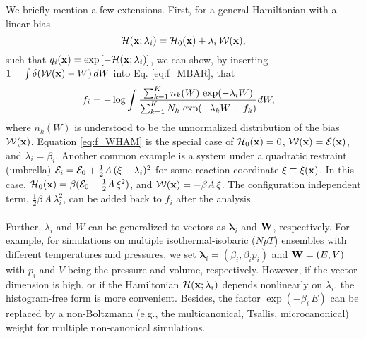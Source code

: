 \documentclass[aip,jcp,preprint,superscriptaddress]{revtex4-1}
\begin{document}
We briefly mention a few extensions.
%
First,
for a general Hamiltonian
with a linear bias
\[
\mathcal{H}(\mathbf{x}; \lambda_i) = \mathcal{H}_0(\mathbf{x}) + \lambda_i \, \mathcal{W}(\mathbf{x}),
\]
such that $q_i(\mathbf{x}) = \exp\left[ -\mathcal{H}(\mathbf{x}; \lambda_i) \right]$,
%
we can show,
by inserting
$1 = \int \delta(\mathcal{W}(\mathbf{x}) - W) \, dW$
into Eq. \eqref{eq:f_MBAR},
that
%
\begin{align}
f_i
&=
-\log
  \int
    \frac{
      \sum_{k = 1}^K n_k(W) \, \exp(-\lambda_i W)
    }
    {
      \sum_{k = 1}^K N_k \, \exp(-\lambda_k W + f_k)
    }
    d W,
\notag
\end{align}
%
where
$n_k(W)$
is understood to be
the unnormalized distribution of
the bias $\mathcal{W}(\mathbf{x})$.
%
Equation \eqref{eq:f_WHAM}
is the special case of
$\mathcal{H}_0(\mathbf{x}) = 0$,
$\mathcal{W}(\mathbf{x}) = \mathcal{E}(\mathbf{x})$,
and $\lambda_i = \beta_i$.
%
Another common example
is a system under a quadratic restraint (umbrella)
$\mathcal{E}_i = \mathcal{E}_0 + \frac 1 2 A \, (\xi - \lambda_i)^2$
for some reaction coordinate $\xi \equiv \xi(\mathbf{x})$.
%
In this case,
$\mathcal{H}_0(\mathbf{x}) = \beta (\mathcal{E}_0 + \frac 1 2 A \, \xi^2)$,
and
$\mathcal{W}(\mathbf{x}) = -\beta A \, \xi$.
%
The configuration independent term,
$\frac 1 2 \beta \, A \, \lambda_i^2$,
can be added back to $f_i$ after the analysis.



\paragraph*{}



Further,
$\lambda_i$ and $W$
can be generalized
to vectors as
$\bm{\lambda}_i$
and
$\mathbf{W}$, respectively.
%
For example,
for simulations
on multiple isothermal-isobaric ($NpT$) ensembles
with different temperatures and pressures,
%
we set
$\bm{\lambda}_i = (\beta_i, \beta_i p_i)$
and
$\mathbf{W} = (E, V)$
with
$p_i$ and $V$
being the pressure and volume,
respectively.
%
However, if the vector dimension is high,
or if the Hamiltonian $\mathcal{H}(\mathbf{x}; \lambda_i)$
depends nonlinearly on $\lambda_i$,
the histogram-free form is more convenient\cite{
shirts2008}.
%
Besides,
the factor $\exp(-\beta_i \, E)$
can be replaced by
a non-Boltzmann
(e.g., the multicanonical\cite{
mezei1987, *berg1992, *lee1993},
Tsallis\cite{tsallis1988},
microcanonical\cite{
yan2003, *martin-mayor2007, *zhang2013})
weight
for multiple non-canonical simulations\cite{
kim2011}.
%
\end{document}
